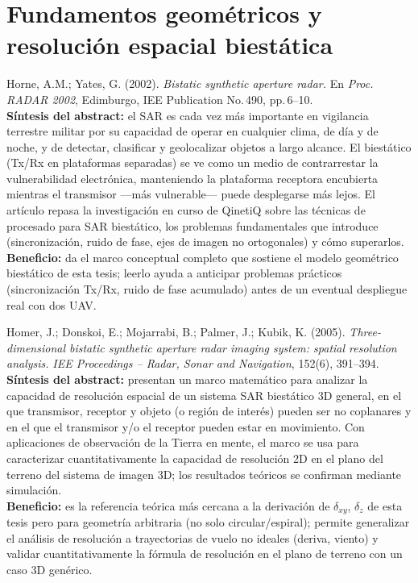 \documentclass[11pt,a4paper]{article}
\begin{document}
\section{Fundamentos geométricos y resolución espacial biestática}
\label{sec:fundamentos}

\begin{enumerate}[label=\textbf{[A\arabic*]}, leftmargin=2.2cm, itemsep=10pt]

\item Horne, A.M.; Yates, G. (2002). \textit{Bistatic synthetic aperture
radar.} En \emph{Proc. RADAR 2002}, Edimburgo, IEE Publication No.\,490,
pp.\,6--10. \cite{horne2002}\\
\textbf{Síntesis del abstract:} el SAR es cada vez más importante en
vigilancia terrestre militar por su capacidad de operar en cualquier clima,
de día y de noche, y de detectar, clasificar y geolocalizar objetos a largo
alcance. El biestático (Tx/Rx en plataformas separadas) se ve como un medio
de contrarrestar la vulnerabilidad electrónica, manteniendo la plataforma
receptora encubierta mientras el transmisor —más vulnerable— puede
desplegarse más lejos. El artículo repasa la investigación en curso de
QinetiQ sobre las técnicas de procesado para SAR biestático, los problemas
fundamentales que introduce (sincronización, ruido de fase, ejes de imagen
no ortogonales) y cómo superarlos.\\
\textbf{Beneficio:} da el marco conceptual completo que sostiene el modelo
geométrico biestático de esta tesis; leerlo ayuda a anticipar problemas
prácticos (sincronización Tx/Rx, ruido de fase acumulado) antes de un
eventual despliegue real con dos UAV.

\item Homer, J.; Donskoi, E.; Mojarrabi, B.; Palmer, J.; Kubik, K. (2005).
\textit{Three-dimensional bistatic synthetic aperture radar imaging system:
spatial resolution analysis.} \emph{IEE Proceedings -- Radar, Sonar and
Navigation}, 152(6), 391--394. \cite{homer2005}\\
\textbf{Síntesis del abstract:} presentan un marco matemático para analizar
la capacidad de resolución espacial de un sistema SAR biestático 3D
general, en el que transmisor, receptor y objeto (o región de interés)
pueden ser no coplanares y en el que el transmisor y/o el receptor pueden
estar en movimiento. Con aplicaciones de observación de la Tierra en mente,
el marco se usa para caracterizar cuantitativamente la capacidad de
resolución 2D en el plano del terreno del sistema de imagen 3D; los
resultados teóricos se confirman mediante simulación.\\
\textbf{Beneficio:} es la referencia teórica más cercana a la derivación de
$\delta_{xy}$, $\delta_z$ de esta tesis pero para geometría arbitraria (no
solo circular/espiral); permite generalizar el análisis de resolución a
trayectorias de vuelo no ideales (deriva, viento) y validar
cuantitativamente la fórmula de resolución en el plano de terreno con un
caso 3D genérico.


\end{enumerate}
\end{document}
